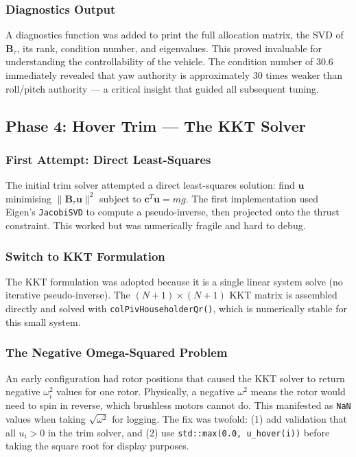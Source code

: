 \documentclass[12pt, a4paper]{article}
\newcommand{\bu}{\bm{u}}
\newcommand{\bB}{\bm{B}}
\begin{document}
\subsubsection{Diagnostics Output}

A diagnostics function was added to print the full allocation matrix, the SVD of $\bB_\tau$, its rank, condition number, and eigenvalues.  This proved invaluable for understanding the controllability of the vehicle.  The condition number of 30.6 immediately revealed that yaw authority is approximately 30 times weaker than roll/pitch authority --- a critical insight that guided all subsequent tuning.

\subsection{Phase 4: Hover Trim --- The KKT Solver}

\subsubsection{First Attempt: Direct Least-Squares}

The initial trim solver attempted a direct least-squares solution: find $\bu$ minimising $\|\bB_\tau \bu\|^2$ subject to $\bm{c}^T \bu = mg$.  The first implementation used Eigen's \texttt{JacobiSVD} to compute a pseudo-inverse, then projected onto the thrust constraint.  This worked but was numerically fragile and hard to debug.

\subsubsection{Switch to KKT Formulation}

The KKT formulation was adopted because it is a single linear system solve (no iterative pseudo-inverse).  The $(N+1) \times (N+1)$ KKT matrix is assembled directly and solved with \texttt{colPivHouseholderQr()}, which is numerically stable for this small system.

\subsubsection{The Negative Omega-Squared Problem}

An early configuration had rotor positions that caused the KKT solver to return negative $\omega_i^2$ values for one rotor.  Physically, a negative $\omega^2$ means the rotor would need to spin in reverse, which brushless motors cannot do.  This manifested as \texttt{NaN} values when taking $\sqrt{\omega^2}$ for logging.  The fix was twofold: (1) add validation that all $u_i > 0$ in the trim solver, and (2) use \texttt{std::max(0.0, u\_hover(i))} before taking the square root for display purposes.
\end{document}
